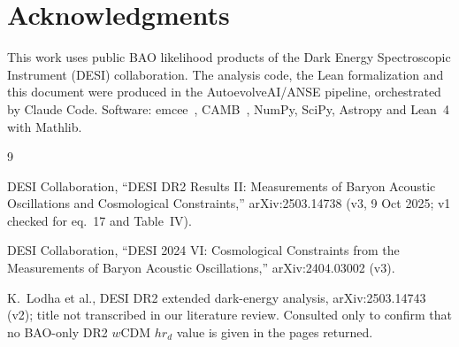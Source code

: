 \documentclass[11pt]{article}
\begin{document}
\section*{Acknowledgments}
This work uses public BAO likelihood products of the Dark Energy
Spectroscopic Instrument (DESI) collaboration. The analysis code, the Lean
formalization and this document were produced in the AutoevolveAI/ANSE
pipeline, orchestrated by Claude Code. Software:
emcee~\EmceeVersion, CAMB~\CambVersion, NumPy, SciPy, Astropy and Lean~4
with Mathlib.

\begin{thebibliography}{9}

DESI Collaboration, ``DESI DR2 Results II: Measurements of Baryon Acoustic
Oscillations and Cosmological Constraints,'' arXiv:2503.14738 (v3, 9 Oct
2025; v1 checked for eq.~17 and Table~IV).

DESI Collaboration, ``DESI 2024 VI: Cosmological Constraints from the
Measurements of Baryon Acoustic Oscillations,'' arXiv:2404.03002 (v3).

K.~Lodha et al., DESI DR2 extended dark-energy analysis, arXiv:2503.14743
(v2); title not transcribed in our literature review. Consulted only to
confirm that no BAO-only DR2 $w$CDM $hr_d$ value is given in the pages
returned.

\end{thebibliography}
\end{document}
